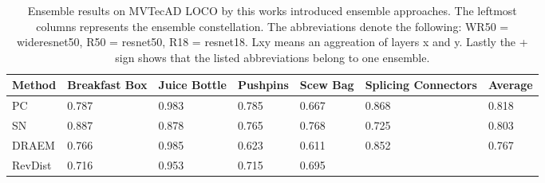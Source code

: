 \begin{table}[htbp]
    \tiny
    \centering
    \begin{tabularx}{\textwidth}{|X|X|X|X|X|X|X|}%
        \hline
        \textbf{Method} & \textbf{Breakfast Box} & \textbf{Juice Bottle} & \textbf{Pushpins} & \textbf{Scew Bag} & \textbf{Splicing Connectors} & \textbf{Average} \\
        \hline
        PC \cite{patchCore2022} & 0.787 & 0.983 & 0.785 & 0.667 & 0.868 & 0.818 \\
        \hline
        SN \cite{liu2023simplenet} & 0.887 & 0.878 & 0.765 & 0.768 & 0.725 & 0.803 \\
        \hline
        DRAEM \cite{Zavrtanik_2021DRAEM} & 0.766 & 0.985 & 0.623 & 0.611 & 0.852 & 0.767 \\
        \hline
        RevDist \cite{revdist2023} & 0.716 & 0.953 & 0.715 & 0.695 &  &  \\
        \hline
    \end{tabularx}
    \caption{Ensemble results on MVTecAD LOCO \cite{LOCODentsAndScratchesBergmann2022} by this works introduced ensemble approaches. The leftmost columns represents the ensemble 
             constellation. The abbreviations denote the following: 
             WR50 = wideresnet50, R50 = resnet50, R18 = resnet18. Lxy means an aggreation of layers x and y. Lastly the + sign shows that the listed abbreviations belong to one ensemble.}
    \label{tab:ensembleimageAUROC}
\end{table}